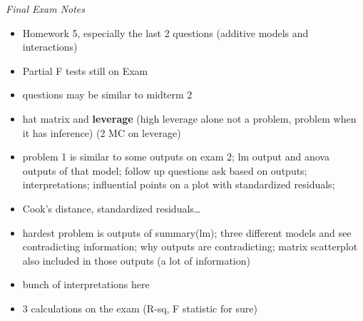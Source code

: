 \documentclass[8pt]{extarticle}
\begin{document}

\textit{Final Exam Notes}
\begin{itemize}
    \item Homework 5, especially the last 2 questions (additive models and 
    interactions)
    \item Partial F tests still on Exam
    \item questions may be similar to midterm 2
    \item hat matrix and \textbf{leverage} (high leverage alone not a problem, problem 
    when it has inference) (2 MC on leverage)
    \item problem 1 is similar to some outputs on exam 2; lm output and anova 
    outputs of that model; follow up questions ask based on outputs; 
    interpretations; influential points on a plot with standardized residuals; 
    \item Cook's distance, standardized residuals\dots
    \item hardest problem is outputs of summary(lm); three different models and 
    see contradicting information; why outputs are contradicting; matrix 
    scatterplot also included in those outputs (a lot of information)
    \item bunch of interpretations here
    \item 3 calculations on the exam (R-sq, F statistic for sure)
\end{itemize}
\end{document}
